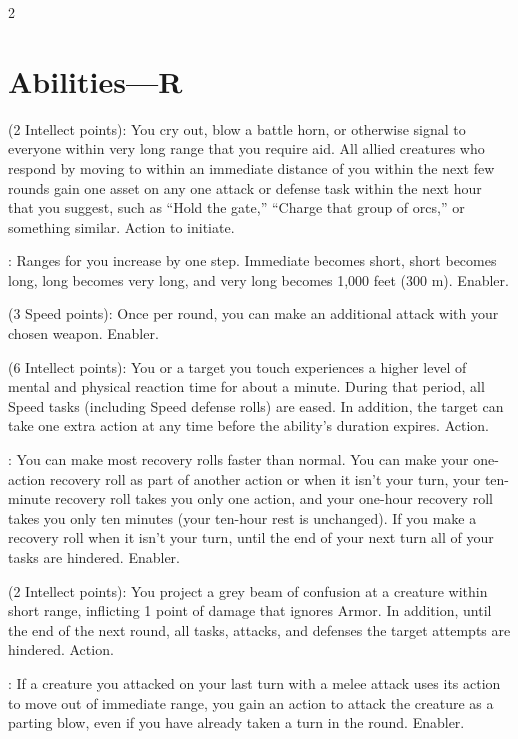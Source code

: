 \begin{multicols}{2}

\section{Abilities—R}

 (2 Intellect points): You cry out, blow a battle horn, or otherwise signal to everyone within very long range that you require aid. All allied creatures who respond by moving to within an immediate distance of you within the next few rounds gain one asset on any one attack or defense task within the next hour that you suggest, such as “Hold the gate,” “Charge that group of orcs,” or something similar. Action to initiate. 
 
: Ranges for you increase by one step. Immediate becomes short, short becomes long, long becomes very long, and very long becomes 1,000 feet (300 m). Enabler. 
 
 (3 Speed points): Once per round, you can make an additional attack with your chosen weapon. Enabler. 
 
 (6 Intellect points): You or a target you touch experiences a higher level of mental and physical reaction time for about a minute. During that period, all Speed tasks (including Speed defense rolls) are eased. In addition, the target can take one extra action at any time before the ability’s duration expires. Action. 
 
: You can make most recovery rolls faster than normal. You can make your
one-action recovery roll as part of another action or when it isn’t your turn, your ten-minute recovery roll takes you only one action, and your one-hour recovery roll takes you only ten minutes (your ten-hour rest is unchanged). If you make a recovery roll when it isn’t your turn, until the end of your next turn all of your tasks are hindered. Enabler.
 
 (2 Intellect points): You project a grey beam of confusion at a creature within short range, inflicting 1 point of damage that ignores Armor. In addition, until the end of the next round, all tasks, attacks, and defenses the target attempts are hindered. Action.
 
: If a creature you attacked on your last turn with a melee attack uses its action to move out of immediate range, you gain an action to attack the creature as a parting blow, even if you have already taken a turn in the round. Enabler. 
 

\end{multicols}
